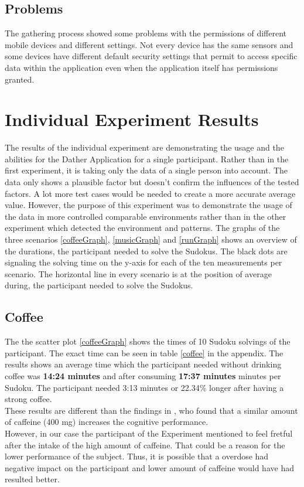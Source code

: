 \FloatBarrier

\subsection{Problems}
The gathering process showed some problems with the permissions of different mobile devices and different settings. Not every device has the same sensors and some devices have different default security settings that permit to access specific data within the application even when the application itself has permissions granted.


\section{Individual Experiment Results}
The results of the individual experiment are demonstrating the usage and the abilities for the Dather Application for a single participant. Rather than in the first experiment, it is taking only the data of a single person into account.
The data only shows a plausible factor but doesn't confirm the influences of the tested factors. A lot more test cases would be needed to create a more accurate average value. However, the purpose of this experiment was to demonstrate the usage of the data in more controlled comparable environments rather than in the other experiment which detected the environment and patterns. 
\bigbreak
The graphs of the three scenarios \ref{coffeeGraph}, \ref{musicGraph} and \ref{runGraph} shows an overview of the durations, the participant needed to solve the Sudokus. The black dots are signaling the solving time on the y-axis for each of the ten measurements per scenario. The horizontal line in every scenario is at the position of average during, the participant needed to solve the Sudokus. 

\FloatBarrier
\subsection{Coffee}
The the scatter plot \ref{coffeeGraph} shows the times of 10 Sudoku solvings of the participant. The exact time can be seen in table \ref{coffee} in the appendix.
\bigbreak
The results shows an average time which the participant needed without drinking coffee was \textbf{14:24 minutes} and after consuming \textbf{17:37 minutes} minutes per Sudoku. The participant needed 3:13 minutes or 22.34\%  longer after having a strong coffee.\\
These results are different than the findings in \cite{liguori1997absorption}, who found that a similar amount of caffeine (400 mg) increases the cognitive performance. \\
However, in our case the participant of the Experiment mentioned to feel fretful after the intake of the high amount of caffeine. That could be a reason for the lower performance of the subject. Thus, it is possible that a overdose had negative impact on the participant and lower amount of caffeine would have had resulted better. 

